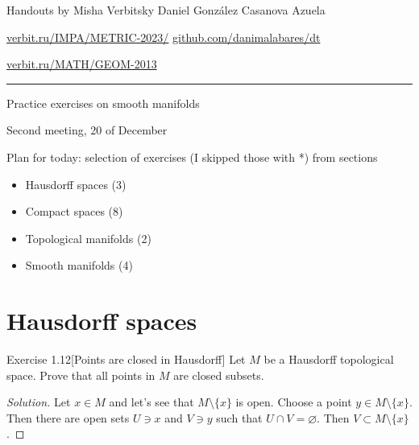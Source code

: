 \usepackage{multicol}
%



\begin{minipage}{\textwidth}
	\begin{minipage}{1\textwidth}
	Handouts by Misha Verbitsky	 \hfill Daniel González Casanova Azuela
		
		{\small \href{http://verbit.ru/IMPA/METRIC-2023/}{verbit.ru/IMPA/METRIC-2023/} \hfill\href{https://github.com/danimalabares/dt}{github.com/danimalabares/dt}

		 \href{http://verbit.ru/MATH/GEOM-2013/}{verbit.ru/MATH/GEOM-2013}}
	\end{minipage}
\end{minipage}\vspace{.2cm}\hrule

\vspace{10pt}
{\huge Practice exercises on smooth manifolds}

{\large Second meeting, 20 of December}
\vspace{1em}

Plan for today: selection of exercises (I skipped those with *) from sections

\begin{itemize}
\item Hausdorff spaces (3)
\item Compact spaces (8)
\item Topological manifolds (2)
\item Smooth manifolds (4)
\end{itemize}

\section{Hausdorff spaces}

\begin{thing4}{Exercise 1.12}[Points are closed in Hausdorff]\label{exer:1.12}\leavevmode
Let $M$ be a Hausdorff topological space. Prove that all points in $M$ are closed subsets.
\end{thing4}

\begin{proof}[Solution]\leavevmode
Let $x \in M$ and let's see that $M\setminus \{x\}$ is open. Choose a point $y \in M\setminus \{ x\}$. Then there are open sets $U \ni x$ and $V \ni y$ such that $ U \cap V= \varnothing$. Then $V \subset M\setminus \{ x\}$.
\end{proof}

